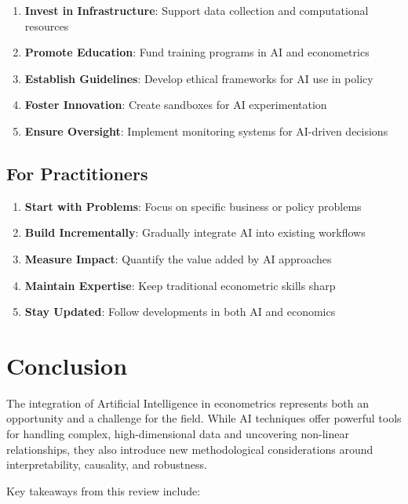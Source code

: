 \documentclass[12pt,a4paper]{article}
\begin{document}
\begin{enumerate}
    \item \textbf{Invest in Infrastructure}: Support data collection and computational resources
    \item \textbf{Promote Education}: Fund training programs in AI and econometrics
    \item \textbf{Establish Guidelines}: Develop ethical frameworks for AI use in policy
    \item \textbf{Foster Innovation}: Create sandboxes for AI experimentation
    \item \textbf{Ensure Oversight}: Implement monitoring systems for AI-driven decisions
\end{enumerate}

\subsection{For Practitioners}

\begin{enumerate}
    \item \textbf{Start with Problems}: Focus on specific business or policy problems
    \item \textbf{Build Incrementally}: Gradually integrate AI into existing workflows
    \item \textbf{Measure Impact}: Quantify the value added by AI approaches
    \item \textbf{Maintain Expertise}: Keep traditional econometric skills sharp
    \item \textbf{Stay Updated}: Follow developments in both AI and economics
\end{enumerate}

\section{Conclusion}

The integration of Artificial Intelligence in econometrics represents both an opportunity and a challenge for the field. While AI techniques offer powerful tools for handling complex, high-dimensional data and uncovering non-linear relationships, they also introduce new methodological considerations around interpretability, causality, and robustness.

Key takeaways from this review include:
\end{document}
